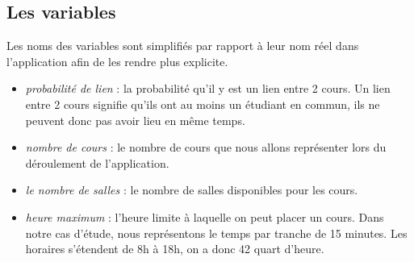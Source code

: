 \documentclass[a4paper,11pt]{article}
\begin{document}
	\subsection{Les variables}
		Les noms des variables sont simplifiés par rapport à leur nom réel dans l'application afin de les rendre plus explicite.
		\begin{itemize}
			\item \textit{probabilité de lien} : la probabilité qu'il y est un lien entre 2 cours. Un lien entre 2 cours signifie qu'ils ont au moins un étudiant en commun, ils ne peuvent donc pas avoir lieu en même temps.
			\item \textit{nombre de cours} : le nombre de cours que nous allons représenter lors du déroulement de l'application. 
			\item  \textit{le nombre de salles} : le nombre de salles disponibles pour les cours.
			\item \textit{heure maximum} : l'heure limite à laquelle on peut placer un cours. Dans notre cas d'étude, nous représentons le temps par tranche de 15 minutes. Les horaires s'étendent de 8h à 18h, on a donc 42 quart d'heure.
		\end{itemize}
\end{document}
